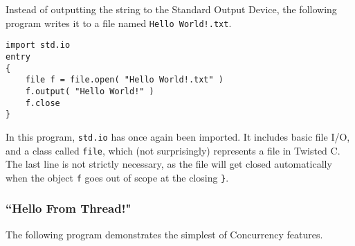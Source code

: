\documentclass[a4paper,11pt]{article}
\newcommand{\tcode}[1]{\texttt{#1}}
\begin{document}
Instead of outputting the string to the Standard Output Device, the following program writes it to a file named \tcode{Hello World!.txt}.
\begin{lstlisting}
import std.io
entry
{
    file f = file.open( "Hello World!.txt" )
    f.output( "Hello World!" )
    f.close
}
\end{lstlisting}
In this program, \tcode{std.io} has once again been imported.
It includes basic file I/O, and a class called \tcode{file}, which (not surprisingly) represents a file in Twisted C.
The last line is not strictly necessary, as the file will get closed automatically when the object \tcode{f} goes out of scope at the closing \tcode{\}}.

    \subsubsection{``Hello From Thread!"}

The following program demonstrates the simplest of Concurrency features.
\end{document}

